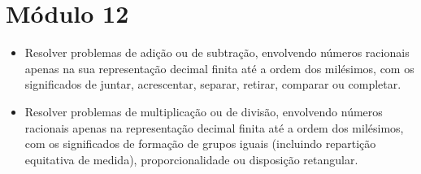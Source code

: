 \chapter{Módulo 12}



\begin{itemize}
\item Resolver problemas de adição ou de subtração, envolvendo números
racionais apenas na sua representação decimal finita até a ordem dos
milésimos, com os significados de juntar, acrescentar, separar, retirar,
comparar ou completar.

\item Resolver problemas de multiplicação ou de divisão, envolvendo números
racionais apenas na representação decimal finita até a ordem dos
milésimos, com os significados de formação de grupos iguais (incluindo
repartição equitativa de medida), proporcionalidade ou disposição
retangular.
\end{itemize}


